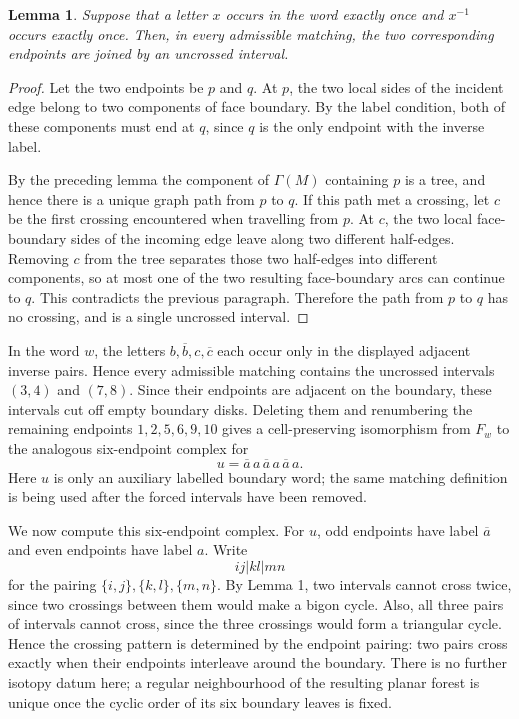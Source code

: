 \documentclass[12pt]{article}
\newtheorem{lemma}{Lemma}
\newcommand{\ol}{\overline}
\begin{document}
\begin{lemma}
Suppose that a letter \(x\) occurs in the word exactly once and
\(x^{-1}\) occurs exactly once.  Then, in every admissible matching, the
two corresponding endpoints are joined by an uncrossed interval.
\end{lemma}

\begin{proof}
Let the two endpoints be \(p\) and \(q\).  At \(p\), the two local sides
of the incident edge belong to two components of face boundary.  By the
label condition, both of these components must end at \(q\), since
\(q\) is the only endpoint with the inverse label.

By the preceding lemma the component of \(\Gamma(M)\) containing \(p\)
is a tree, and hence there is a unique graph path from \(p\) to \(q\).
If this path met a crossing, let \(c\) be the first crossing encountered
when travelling from \(p\).  At \(c\), the two local face-boundary sides
of the incoming edge leave along two different half-edges.  Removing
\(c\) from the tree separates those two half-edges into different
components, so at most one of the two resulting face-boundary arcs can
continue to \(q\).  This contradicts the previous paragraph.  Therefore
the path from \(p\) to \(q\) has no crossing, and is a single uncrossed
interval.
\end{proof}

In the word \(w\), the letters \(b,\ol b,c,\ol c\) each occur only in
the displayed adjacent inverse pairs.  Hence every admissible matching
contains the uncrossed intervals \((3,4)\) and \((7,8)\).  Since their
endpoints are adjacent on the boundary, these intervals cut off empty
boundary disks.  Deleting them and renumbering the remaining endpoints
\(1,2,5,6,9,10\) gives a cell-preserving isomorphism from \(F_w\) to the
analogous six-endpoint complex for
\[
        u=\ol a\,a\,\ol a\,a\,\ol a\,a .
\]
Here \(u\) is only an auxiliary labelled boundary word; the same matching
definition is being used after the forced intervals have been removed.

We now compute this six-endpoint complex.  For \(u\), odd endpoints have
label \(\ol a\) and even endpoints have label \(a\).  Write
\[
        ij|kl|mn
\]
for the pairing \(\{i,j\},\{k,l\},\{m,n\}\).  By Lemma 1, two intervals
cannot cross twice, since two crossings between them would make a bigon
cycle.  Also, all three pairs of intervals cannot cross, since the
three crossings would form a triangular cycle.  Hence the crossing
pattern is determined by the endpoint pairing: two pairs cross exactly
when their endpoints interleave around the boundary.  There is no
further isotopy datum here; a regular neighbourhood of the resulting
planar forest is unique once the cyclic order of its six boundary leaves
is fixed.
\end{document}
